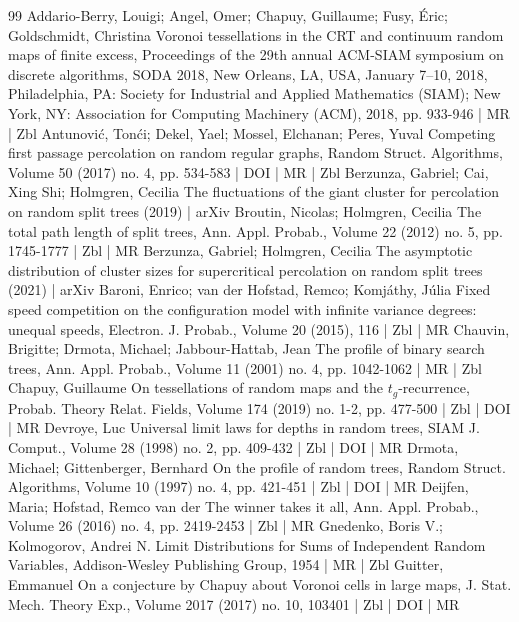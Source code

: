 \documentclass[10pt]{amsart}
\theoremstyle{definition}\newtheorem{defi}[theo]{Definition}\newtheorem{rema}[theo]{Remark}\newtheorem{exam}[theo]{Example}\newtheorem{exem}[theo]{Example}\newtheorem{nota}[theo]{Notation}
\begin{document}
\begin{thebibliography}{99}
 Addario-Berry, Louigi; Angel, Omer; Chapuy, Guillaume; Fusy, Éric; Goldschmidt, Christina Voronoi tessellations in the CRT and continuum random maps of finite excess, Proceedings of the 29th annual ACM-SIAM symposium on discrete algorithms, SODA 2018, New Orleans, LA, USA, January 7–10, 2018, Philadelphia, PA: Society for Industrial and Applied Mathematics (SIAM); New York, NY: Association for Computing Machinery (ACM), 2018, pp. 933-946 | MR | Zbl
 Antunović, Tonći; Dekel, Yael; Mossel, Elchanan; Peres, Yuval Competing first passage percolation on random regular graphs, Random Struct. Algorithms, Volume 50 (2017) no. 4, pp. 534-583 | DOI | MR | Zbl
 Berzunza, Gabriel; Cai, Xing Shi; Holmgren, Cecilia The fluctuations of the giant cluster for percolation on random split trees (2019) | arXiv
 Broutin, Nicolas; Holmgren, Cecilia The total path length of split trees, Ann. Appl. Probab., Volume 22 (2012) no. 5, pp. 1745-1777 | Zbl | MR
 Berzunza, Gabriel; Holmgren, Cecilia The asymptotic distribution of cluster sizes for supercritical percolation on random split trees (2021) | arXiv
 Baroni, Enrico; van der Hofstad, Remco; Komjáthy, Júlia Fixed speed competition on the configuration model with infinite variance degrees: unequal speeds, Electron. J. Probab., Volume 20 (2015), 116 | Zbl | MR
 Chauvin, Brigitte; Drmota, Michael; Jabbour-Hattab, Jean The profile of binary search trees, Ann. Appl. Probab., Volume 11 (2001) no. 4, pp. 1042-1062 | MR | Zbl
 Chapuy, Guillaume On tessellations of random maps and the $t_g$-recurrence, Probab. Theory Relat. Fields, Volume 174 (2019) no. 1-2, pp. 477-500 | Zbl | DOI | MR
 Devroye, Luc Universal limit laws for depths in random trees, SIAM J. Comput., Volume 28 (1998) no. 2, pp. 409-432 | Zbl | DOI | MR
 Drmota, Michael; Gittenberger, Bernhard On the profile of random trees, Random Struct. Algorithms, Volume 10 (1997) no. 4, pp. 421-451 | Zbl | DOI | MR
 Deijfen, Maria; Hofstad, Remco van der The winner takes it all, Ann. Appl. Probab., Volume 26 (2016) no. 4, pp. 2419-2453 | Zbl | MR
 Gnedenko, Boris V.; Kolmogorov, Andrei N. Limit Distributions for Sums of Independent Random Variables, Addison-Wesley Publishing Group, 1954 | MR | Zbl
 Guitter, Emmanuel On a conjecture by Chapuy about Voronoi cells in large maps, J. Stat. Mech. Theory Exp., Volume 2017 (2017) no. 10, 103401 | Zbl | DOI | MR

\end{thebibliography}
\end{document}

